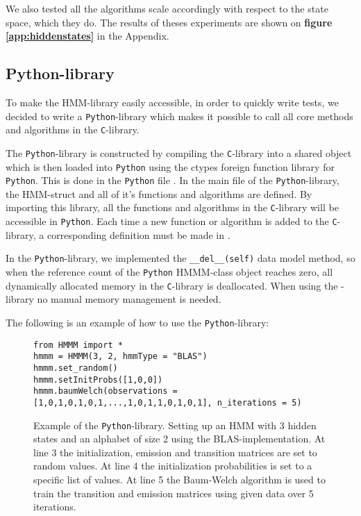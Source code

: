 We also tested all the algorithms scale accordingly with respect to the state space, which they do. The results of theses experiments are shown on \textbf{figure \ref{app:hiddenstates}} in the Appendix.

\subsection{Python-library}\label{sec:pb}
To make the HMM-library easily accessible, in order to quickly write tests, we decided to write a \texttt{Python}-library which makes it possible to call all core methods and algorithms in the \texttt{C}-library.

The \texttt{Python}-library is constructed by compiling the \texttt{C}-library into a shared object which is then loaded into \texttt{Python} using the ctypes foreign function library\cite{ctypesman} for \texttt{Python}.
This is done in the \texttt{Python} file .
In the main file of the \texttt{Python}-library, the HMM-struct and all of it's functions and algorithms are defined. By importing this library, all the functions and algorithms in the \texttt{C}-library will be accessible in \texttt{Python}.
Each time a new function or algorithm is added to the \texttt{C}-library, a corresponding definition must be made in .


In the \texttt{Python}-library, we implemented the \texttt{\_\_del\_\_(self)} data model method\cite{pythonman}, so when the reference count of the \texttt{Python} HMMM-class object reaches zero, all dynamically allocated memory in the \texttt{C}-library is deallocated. When using the -library no manual memory management is needed.

The following is an example of how to use the \texttt{Python}-library:

\begin{figure}[H]
    \centering
\begin{lstlisting}[style=PYstyle]
from HMMM import *
hmmm = HMMM(3, 2, hmmType = "BLAS") 
hmmm.set_random()  
hmmm.setInitProbs([1,0,0])
hmmm.baumWelch(observations = [1,0,1,0,1,0,1,...,1,0,1,1,0,1,0,1], n_iterations = 5)\end{lstlisting}
\caption{\small{Example of the \texttt{Python}-library. Setting up an HMM with 3 hidden states and an alphabet of size 2 using the BLAS-implementation. At line 3 the initialization, emission and transition matrices are set to random values. At line 4 the initialization probabilities is set to a specific list of values.
At line 5 the Baum-Welch algorithm is used to train the transition and emission matrices using given data over 5 iterations.}}
\label{fig:pybind}
\end{figure}

